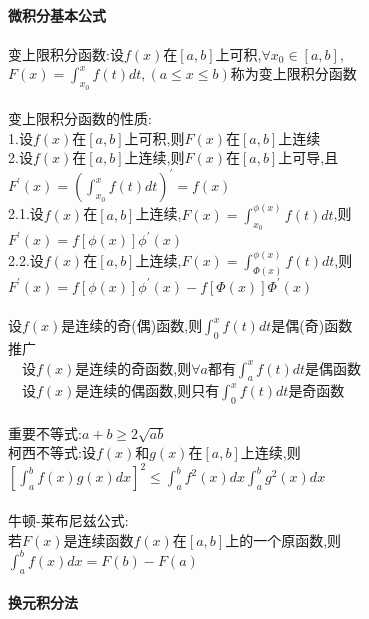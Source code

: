 \documentclass{article}
\begin{document}
\begin{flushleft}
	~\\ \textbf{微积分基本公式} \\~\\
	
	变上限积分函数:设$f(x)$在$[a,b]$上可积,$\forall x_0\in [a,b]$,$F(x)=\int_{x_0}^{x}f(t)dt,(a\le x\le b)$称为变上限积分函数\\
	~\\
	变上限积分函数的性质:\\
	1.设$f(x)$在$[a,b]$上可积,则$F(x)$在$[a,b]$上连续\\
	2.设$f(x)$在$[a,b]$上连续,则$F(x)$在$[a,b]$上可导,且$F^{'}(x)=(\int_{x_0}^{x}f(t)dt)^{'}=f(x)$\\
	2.1.设$f(x)$在$[a,b]$上连续,$F(x)=\int_{x_0}^{\phi(x)}f(t)dt$,则$F^{'}(x)=f[\phi(x)]\phi^{'}(x)$\\
	2.2.设$f(x)$在$[a,b]$上连续,$F(x)=\int_{\Phi(x)}^{\phi(x)}f(t)dt$,则$F^{'}(x)=f[\phi(x)]\phi^{'}(x)-f[\Phi(x)]\Phi^{'}(x)$\\
	~\\
	设$f(x)$是连续的奇(偶)函数,则$\int_{0}^{x}f(t)dt$是偶(奇)函数\\
	推广\\
	\ \ 设$f(x)$是连续的奇函数,则$\forall a$都有$\int_{a}^{x}f(t)dt$是偶函数\\
	\ \ 设$f(x)$是连续的偶函数,则只有$\int_{0}^{x}f(t)dt$是奇函数\\
	~\\
	重要不等式:$a+b\ge 2\sqrt{ab}$\\
	柯西不等式:设$f(x)$和$g(x)$在$[a,b]$上连续,则$[\int_{a}^{b}f(x)g(x)dx]^2\le \int_{a}^{b}f^2(x)dx\int_{a}^{b}g^2(x)dx$\\
	~\\
	牛顿-莱布尼兹公式:\\
	若$F(x)$是连续函数$f(x)$在$[a,b]$上的一个原函数,则$\int_{a}^{b}f(x)dx=F(b)-F(a)$\\
	
	~\\ \textbf{换元积分法} \\~\\
	

\end{flushleft}
\end{document}
